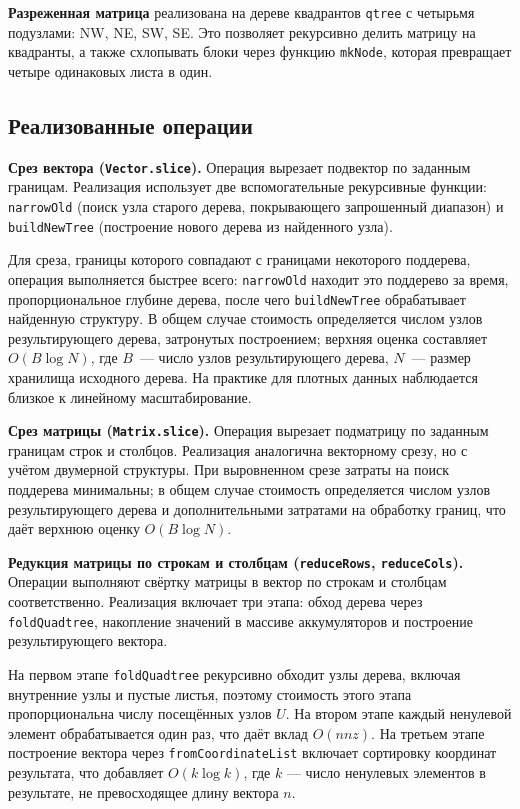 \documentclass[a4paper]{article}
\begin{document}
\textbf{Разреженная матрица} реализована на дереве квадрантов \texttt{qtree} с четырьмя подузлами: NW, NE, SW, SE. Это позволяет рекурсивно делить матрицу на квадранты, а также схлопывать блоки через функцию \texttt{mkNode}, которая превращает четыре одинаковых листа в один.

\subsection{Реализованные операции}

\textbf{Срез вектора (\texttt{Vector.slice}).} Операция вырезает подвектор по заданным границам. Реализация использует две вспомогательные рекурсивные функции: \texttt{narrowOld} (поиск узла старого дерева, покрывающего запрошенный диапазон) и \texttt{buildNewTree} (построение нового дерева из найденного узла). 

Для среза, границы которого совпадают с границами некоторого поддерева, операция выполняется быстрее всего: \texttt{narrowOld} находит это поддерево за время, пропорциональное глубине дерева, после чего \texttt{buildNewTree} обрабатывает найденную структуру. В общем случае стоимость определяется числом узлов результирующего дерева, затронутых построением; верхняя оценка составляет \(O(B \log N)\), где \(B\)~--- число узлов результирующего дерева, \(N\)~--- размер хранилища исходного дерева. На практике для плотных данных наблюдается близкое к линейному масштабирование.

\textbf{Срез матрицы (\texttt{Matrix.slice}).} Операция вырезает подматрицу по заданным границам строк и столбцов. Реализация аналогична векторному срезу, но с учётом двумерной структуры. При выровненном срезе затраты на поиск поддерева минимальны; в общем случае стоимость определяется числом узлов результирующего дерева и дополнительными затратами на обработку границ, что даёт верхнюю оценку \(O(B \log N)\). 

\textbf{Редукция матрицы по строкам и столбцам (\texttt{reduceRows}, \texttt{reduceCols}).} Операции выполняют свёртку матрицы в вектор по строкам и столбцам соответственно. Реализация включает три этапа: обход дерева через \texttt{foldQuadtree}, накопление значений в массиве аккумуляторов и построение результирующего вектора. 

На первом этапе \texttt{foldQuadtree} рекурсивно обходит узлы дерева, включая внутренние узлы и пустые листья, поэтому стоимость этого этапа пропорциональна числу посещённых узлов \(U\). На втором этапе каждый ненулевой элемент обрабатывается один раз, что даёт вклад \(O(nnz)\). На третьем этапе построение вектора через \texttt{fromCoordinateList} включает сортировку координат результата, что добавляет \(O(k \log k)\), где \(k\) — число ненулевых элементов в результате, не превосходящее длину вектора \(n\). 
\end{document}
